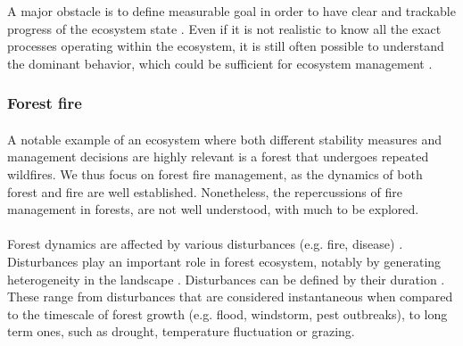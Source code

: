 \documentclass{article}
\begin{document}
A major obstacle is to define measurable goal in order to have clear and trackable progress of the ecosystem state \citep{slocombe_forum:_1998}. Even if it is not realistic to know all the exact processes operating within the ecosystem, it is still often possible to understand the dominant behavior, which could be sufficient for ecosystem management \citep{mori_ecosystem_2011, slocombe_forum:_1998, stanley_ecosystem_1995}.

\subsubsection*{Forest fire}

\paragraph{}
A notable example of an ecosystem where both different stability measures and management decisions are highly relevant is a forest that undergoes repeated wildfires. We thus focus on forest fire management, as the dynamics of both forest and fire are well established. Nonetheless, the repercussions of fire management in forests, are not well understood, with much to be explored.

\paragraph{}

Forest dynamics are affected by various disturbances (e.g. fire, disease) \citep{attiwill_disturbance_nodate}. Disturbances play an important role in forest ecosystem, notably by generating heterogeneity in the landscape \citep{turner2010disturbance}. Disturbances can be defined by their duration \citep{perera_simulation_2015}. These range from disturbances that are considered instantaneous when compared to the timescale of forest growth (e.g. flood, windstorm, pest outbreaks), to long term ones, such as drought, temperature fluctuation or grazing.

\end{document}

